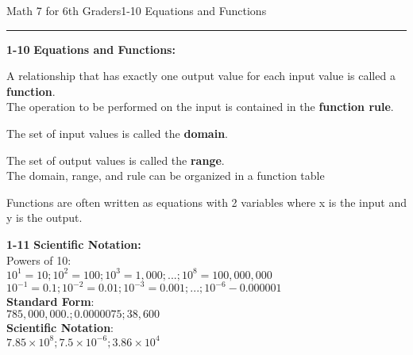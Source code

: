 \begin{enumerate*}
\newpage
\noindent\Large{Math 7 for 6th Graders\hfill 1-10 Equations and Functions}
\noindent\hrule
\vspace{5mm}

		\item[\Large\textbf{1-10}] \Large\textbf{Equations and Functions:}\\
			\begin{enumerate*}
				\item[]A relationship that has exactly one output value for each input value is called a \textbf{function}.\\
					The operation to be performed on the input is contained in the \textbf{function rule}.\\
				\item[]The set of input values is called the \textbf{domain}.\\
				\item[]The set of output values is called the \textbf{range}.\\
					The domain, range, and rule can be organized in a function table\\
				\item[]Functions are often written as equations with 2 variables where x is the input and y is the output.\\
			\end{enumerate*}
			
		\item[\Large\textbf{1-11}] \Large\textbf{Scientific Notation:}\\
			Powers of 10:\\
			$10^1=10; 10^2=100; 10^3=1,000; ...; 10^8=100,000,000$\\
			$10^{-1}=0.1; 10^{-2}=0.01; 10^{-3}=0.001; ...; 10^{-6}-0.000001$\\
			\textbf{Standard Form}:\\
				$785,000,000.; 0.0000075; 38,600$\\
			\textbf{Scientific Notation}:\\
				$7.85\times10^8; 7.5\times10^{-6}; 3.86\times10^4$\\
				

\end{enumerate*}
